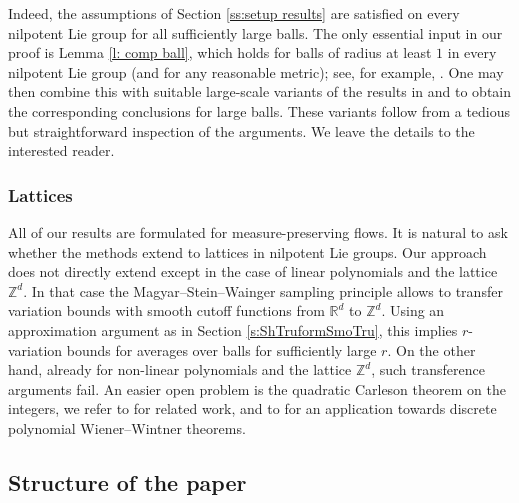 \documentclass[12pt,reqno,a4paper,dvipsnames]{amsart}
\theoremstyle{plain}
\theoremstyle{definition}
\numberwithin{theorem}{section}
\numberwithin{equation}{section}
\newcommand{\R}{\mathbb{R}}
\begin{document}
Indeed, the assumptions of Section \ref{ss:setup results} are satisfied on every nilpotent Lie group for all sufficiently large balls. The only essential input in our proof is Lemma \ref{l: comp ball}, which holds for balls of radius at least $1$ in every nilpotent Lie group (and for any reasonable metric); see, for example, \cite{Karidi, MSW07}. One may then combine this with suitable large-scale variants of the results in \cite{beckeretal} and \cite{zk-var-trunc} to obtain the corresponding conclusions for large balls. These variants follow from a tedious but straightforward inspection of the arguments. We leave the details to the interested reader.

\subsubsection{Lattices}
All of our results are formulated for measure-preserving flows. It is natural to ask whether the methods extend to lattices in nilpotent Lie groups. Our approach does not directly extend except in the case of linear polynomials and the lattice $\mathbb{Z}^d$. In that case the Magyar--Stein--Wainger sampling principle \cite[Proposition 2.1]{Magyar+02} allows to transfer variation bounds with smooth cutoff functions from $\R^d$ to $\mathbb{Z}^d$. Using an approximation argument as in Section \ref{s:ShTruformSmoTru}, this implies $r$-variation bounds for averages over balls for sufficiently large $r$. On the other hand, already for non-linear polynomials and the lattice $\mathbb{Z}^d$, such transference arguments fail. An easier open problem is the quadratic Carleson theorem on the integers, we refer to \cite{KrauseRoos23, Krause24} for related work, and to \cite{krause2025} for an application towards discrete polynomial Wiener--Wintner theorems.  


\subsection{Structure of the paper}
\label{s:overview}
\end{document}
